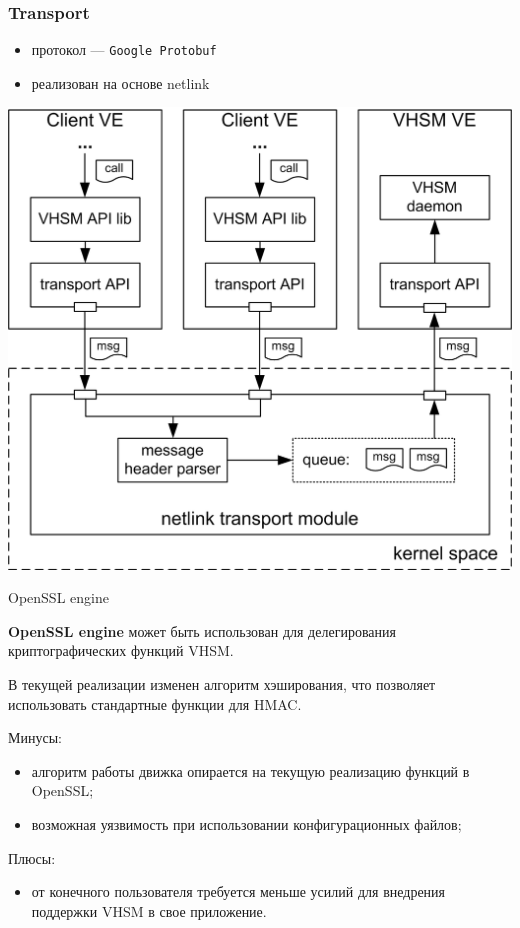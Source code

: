\documentclass[utf8, 11pt]{beamer}
\begin{document}
\begin{frame}[fragile]
\frametitle{Transport}
\begin{itemize}
\item протокол --- \texttt{Google Protobuf}
\item реализован на основе netlink
\end{itemize}
\begin{center}
\includegraphics[scale=0.65]{img4-1}
\end{center}
\end{frame}

\begin{frame}{OpenSSL engine}

{\bf OpenSSL engine} может быть использован для делегирования криптографических функций VHSM.

\vspace*{\fill}

В текущей реализации изменен алгоритм хэширования, что позволяет использовать стандартные функции для HMAC.

\vspace*{\fill}

Минусы:
\begin{itemize} 
\item алгоритм работы движка опирается на текущую реализацию функций в OpenSSL;
\item возможная уязвимость при использовании конфигурационных файлов;
\end{itemize}

Плюсы:
\begin{itemize}
\item от конечного пользователя требуется меньше усилий для внедрения поддержки VHSM в свое приложение.
\end{itemize}

\vspace*{\fill}

\end{frame}
\end{document}
